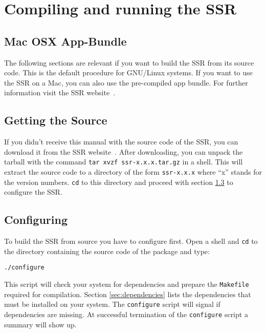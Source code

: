 \section{Compiling and running the SSR}

\subsection{Mac OSX App-Bundle}

The following sections are relevant if you want to build the SSR from its source
code. This is the default procedure for GNU/Linux systems. If you want to use
the SSR on a Mac, you can also use the pre-compiled app bundle.
For further information visit the SSR website~\cite{ssr}.

\subsection{Getting the Source}

If you didn't receive this manual with the source code of the SSR, you can
download it from the SSR website~\cite{ssr}. After downloading, you can unpack the tarball with
the command \verb+tar xvzf ssr-x.x.x.tar.gz+ in a shell. This will extract the
source code to a directory of the form \verb+ssr-x.x.x+ where ``x'' stands for
the version numbers.  \verb+cd+ to this directory and proceed with section
\ref{sec:configuring} to configure the SSR.

\subsection{Configuring}
\label{sec:configuring}

To build the SSR from source you have to configure first. Open a shell and
\verb+cd+ to the directory containing the source code
of the package and type:

\begin{verbatim}
./configure
\end{verbatim}

This script will check your system for dependencies and prepare the
\verb+Makefile+ required for compilation. Section \ref{sec:dependencies} lists
the dependencies that must be installed on your system. The \texttt{configure} script
will signal if dependencies are missing. At successful termination of the 
\texttt{configure} script a summary will show up.

